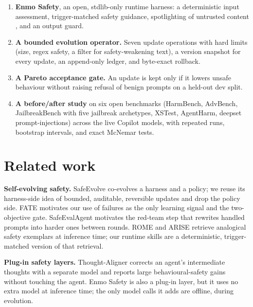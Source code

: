 \begin{enumerate}

\item \textbf{Enmo Safety}, an open, stdlib-only runtime harness: a deterministic input assessment, trigger-matched safety guidance, spotlighting of untrusted content \citep{hines2024spotlighting}, and an output guard.

\item \textbf{A bounded evolution operator.} Seven update operations with hard limits (size, regex safety, a filter for safety-weakening text), a version snapshot for every update, an append-only ledger, and byte-exact rollback.

\item \textbf{A Pareto acceptance gate.} An update is kept only if it lowers unsafe behaviour without raising refusal of benign prompts on a held-out dev split.

\item \textbf{A before/after study} on six open benchmarks (HarmBench, AdvBench, JailbreakBench with five jailbreak archetypes, XSTest, AgentHarm, deepset prompt-injections) across the live Copilot models, with repeated runs, bootstrap intervals, and exact McNemar tests.

\end{enumerate}

\section{Related work}

\textbf{Self-evolving safety.} SafeEvolve \citep{liu2026safeevolve} co-evolves a harness and a policy; we reuse its harness-side idea of bounded, auditable, reversible updates and drop the policy side. FATE \citep{fate2026} motivates our use of failures as the only learning signal and the two-objective gate. SafeEvalAgent \citep{wang2025safeevalagent} motivates the red-team step that rewrites handled prompts into harder ones between rounds. ROME and ARISE \citep{zhu2026rome} retrieve analogical safety exemplars at inference time; our runtime skills are a deterministic, trigger-matched version of that retrieval.

\textbf{Plug-in safety layers.} Thought-Aligner \citep{jiang2025thoughtaligner} corrects an agent's intermediate thoughts with a separate model and reports large behavioural-safety gains without touching the agent. Enmo Safety is also a plug-in layer, but it uses no extra model at inference time; the only model calls it adds are offline, during evolution.

